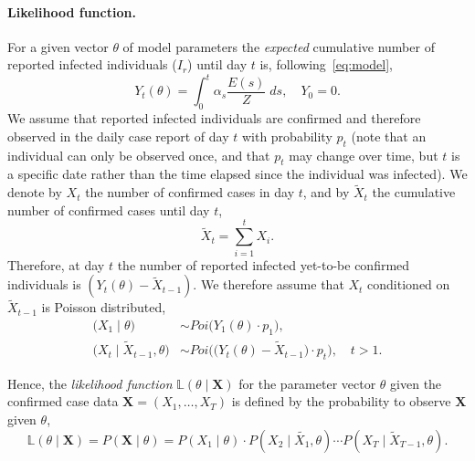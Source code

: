 \documentclass[12pt]{extarticle}
\let\vec\mathbf
\begin{document}
\paragraph*{Likelihood function.}
For a given vector $\theta$ of model parameters the \emph{expected} cumulative number of reported infected individuals ($I_r$) until day $t$ is, following~\autoref{eq:model},
\begin{equation} \label{eq:Yt}
Y_t(\theta) = \int_{0}^{t}{\alpha_s \frac{E(s)}{Z} \; ds}, \quad Y_0 = 0.
\end{equation}
We assume that reported infected individuals are confirmed and therefore observed in the daily case report of day $t$ with probability $p_t$ (note that an individual can only be observed once, and that $p_t$ may change over time, but $t$ is a specific date rather than the time elapsed since the individual was infected).
We denote by $X_t$ the number of confirmed cases in day $t$, and by $\tilde{X}_t$ the cumulative number of confirmed cases until day $t$,
\begin{equation} \label{eq:Xsumt}
\tilde{X}_t=\sum_{i=1}^{t}X_i.
\end{equation}
Therefore, at day $t$ the number of reported infected yet-to-be confirmed individuals is
$(Y_t(\theta) - \tilde{X}_{t-1})$.
We therefore assume that $X_t$ conditioned on $\tilde{X}_{t-1}$ is Poisson distributed,
\begin{equation} \label{eq:Xt} \begin{aligned}
\Big(X_1 \mid \theta \Big) & \sim \mathit{Poi}\big( Y_1(\theta) \cdot p_1 \big), \\
\Big(X_t \mid \tilde{X}_{t-1}, \theta \Big) & \sim 
\mathit{Poi}\Big( \big(Y_t(\theta) - \tilde{X}_{t-1}\big) \cdot p_t \Big), \quad t>1.
\end{aligned}\end{equation}

Hence, the \emph{likelihood function} $\mathbb{L}(\theta \mid \vec{X})$ for the parameter vector $\theta$ given the confirmed case data $\vec{X} = (X_1, \ldots, X_T)$ is defined by the probability to observe  $\vec{X}$ given $\theta$,
\begin{equation} \label{eq:likelihood}
\mathbb{L}(\theta \mid \vec{X}) = 
P(\vec{X} \mid \theta) = 
P(X_1 \mid \theta) \cdot P(X_2 \mid \tilde{X_1}, \theta) \cdots P(X_T \mid \tilde{X}_{T-1}, \theta).
\end{equation}



\end{document}
